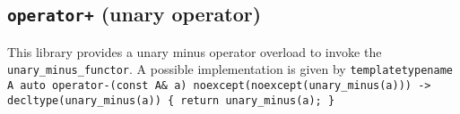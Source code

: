 \subsection{\texttt{operator+} (unary operator)}
This library provides a unary minus operator overload to invoke the \texttt{unary\_minus\_functor}.
A possible implementation is given by\newline
\texttt{template\textlangle typename A\textrangle\newline
auto\newline
operator-(const A\& a)\newline
noexcept(noexcept(unary\_minus(a)))\newline
-> decltype(unary\_minus(a))\newline
\{ return unary\_minus(a); \}}
